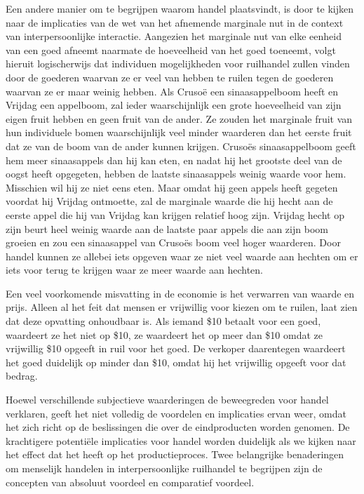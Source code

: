 \documentclass[
  a5paper,
  smalldemyvopaper,11pt,twoside,onecolumn,openright,extrafontsizes,
hidelinks]{memoir}
\begin{document}
Een andere manier om te begrijpen waarom handel plaatsvindt, is door te
kijken naar de implicaties van de wet van het afnemende marginale nut in
de context van interpersoonlijke interactie. Aangezien het marginale nut
van elke eenheid van een goed afneemt naarmate de hoeveelheid van het
goed toeneemt, volgt hieruit logischerwijs dat individuen mogelijkheden
voor ruilhandel zullen vinden door de goederen waarvan ze er veel van
hebben te ruilen tegen de goederen waarvan ze er maar weinig hebben. Als
Crusoë een sinaasappelboom heeft en Vrijdag een appelboom, zal ieder
waarschijnlijk een grote hoeveelheid van zijn eigen fruit hebben en geen
fruit van de ander. Ze zouden het marginale fruit van hun individuele
bomen waarschijnlijk veel minder waarderen dan het eerste fruit dat ze
van de boom van de ander kunnen krijgen. Crusoës sinaasappelboom geeft
hem meer sinaasappels dan hij kan eten, en nadat hij het grootste deel
van de oogst heeft opgegeten, hebben de laatste sinaasappels weinig
waarde voor hem. Misschien wil hij ze niet eens eten. Maar omdat hij
geen appels heeft gegeten voordat hij Vrijdag ontmoette, zal de
marginale waarde die hij hecht aan de eerste appel die hij van Vrijdag
kan krijgen relatief hoog zijn. Vrijdag hecht op zijn beurt heel weinig
waarde aan de laatste paar appels die aan zijn boom groeien en zou een
sinaasappel van Crusoës boom veel hoger waarderen. Door handel kunnen ze
allebei iets opgeven waar ze niet veel waarde aan hechten om er iets
voor terug te krijgen waar ze meer waarde aan hechten.

Een veel voorkomende misvatting in de economie is het verwarren van
waarde en prijs. Alleen al het feit dat mensen er vrijwillig voor kiezen
om te ruilen, laat zien dat deze opvatting onhoudbaar is. Als iemand
\$10 betaalt voor een goed, waardeert ze het niet op \$10, ze waardeert
het op meer dan \$10 omdat ze vrijwillig \$10 opgeeft in ruil voor het
goed. De verkoper daarentegen waardeert het goed duidelijk op minder dan
\$10, omdat hij het vrijwillig opgeeft voor dat bedrag.

Hoewel verschillende subjectieve waarderingen de beweegreden voor handel
verklaren, geeft het niet volledig de voordelen en implicaties ervan
weer, omdat het zich richt op de beslissingen die over de eindproducten
worden genomen. De krachtigere potentiële implicaties voor handel worden
duidelijk als we kijken naar het effect dat het heeft op het
productieproces. Twee belangrijke benaderingen om menselijk handelen in
interpersoonlijke ruilhandel te begrijpen zijn de concepten van absoluut
voordeel en comparatief voordeel.
\end{document}
